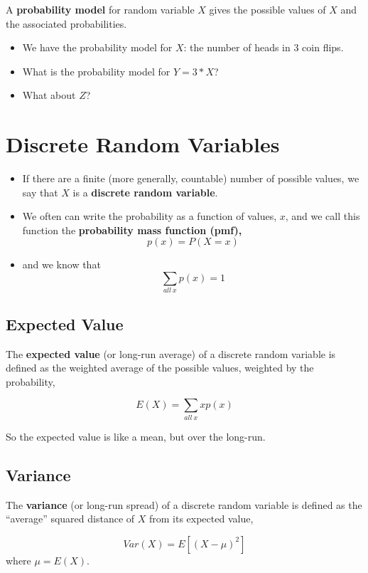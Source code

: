 \documentclass[
]{book}
\providecommand{\tightlist}{%
  \setlength{\itemsep}{0pt}\setlength{\parskip}{0pt}}
\begin{document}
A \textbf{probability model} for random variable \(X\) gives the possible values of \(X\) and the associated probabilities.

\begin{itemize}
\tightlist
\item
  We have the probability model for \(X\): the number of heads in 3 coin flips.
\item
  What is the probability model for \(Y= 3*X\)?
\item
  What about \(Z\)?
\end{itemize}

\section{Discrete Random Variables}\label{discrete-random-variables}

\begin{itemize}
\item
  If there are a finite (more generally, countable) number of possible values, we say that \(X\) is a \textbf{discrete random variable}.
\item
  We often can write the probability as a function of values, \(x\), and we call this function the \textbf{probability mass function (pmf),}
  \[p(x) = P(X = x)\]
\item
  and we know that
  \[\sum_{all~x}p(x) = 1\]
\end{itemize}

\subsection{Expected Value}\label{expected-value}

The \textbf{expected value} (or long-run average) of a discrete random variable is defined as the weighted average of the possible values, weighted by the probability,

\[E(X) = \sum_{all~x} xp(x)\]

So the expected value is like a mean, but over the long-run.

\subsection{Variance}\label{variance}

The \textbf{variance} (or long-run spread) of a discrete random variable is defined as the ``average'' squared distance of \(X\) from its expected value,

\[Var(X) = E[(X-\mu)^2]\]
where \(\mu = E(X)\).
\end{document}

